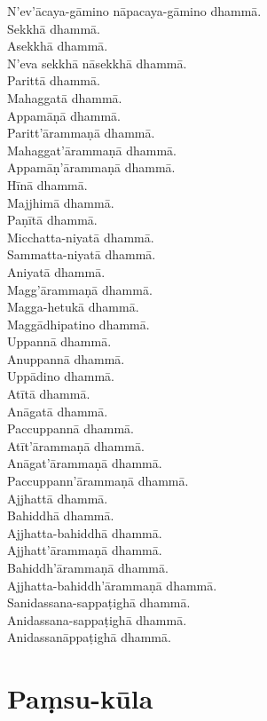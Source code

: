 N'ev'ācaya-gāmino nāpacaya-gāmino dhammā.\\
Sekkhā dhammā.\\
Asekkhā dhammā.\\
N'eva sekkhā nāsekkhā dhammā.\\
Parittā dhammā.\\
Mahaggatā dhammā.\\
Appamāṇā dhammā.\\
Paritt'ārammaṇā dhammā.\\
Mahaggat'ārammaṇā dhammā.\\
Appamāṇ'ārammaṇā dhammā.\\
Hīnā dhammā.\\
Majjhimā dhammā.\\
Paṇītā dhammā.\\
Micchatta-niyatā dhammā.\\
Sammatta-niyatā dhammā.\\
Aniyatā dhammā.\\
Magg'ārammaṇā dhammā.\\
Magga-hetukā dhammā.\\
Maggādhipatino dhammā.\\
Uppannā dhammā.\\
Anuppannā dhammā.\\
Uppādino dhammā.\\
Atītā dhammā.\\
Anāgatā dhammā.\\
Paccuppannā dhammā.\\
Atīt'ārammaṇā dhammā.\\
Anāgat'ārammaṇā dhammā.\\
Paccuppann'ārammaṇā dhammā.\\
Ajjhattā dhammā.\\
Bahiddhā dhammā.\\
Ajjhatta-bahiddhā dhammā.\\
Ajjhatt'ārammaṇā dhammā.\\
Bahiddh'ārammaṇā dhammā.\\
Ajjhatta-bahiddh'ārammaṇā dhammā.\\
Sanidassana-sappaṭighā dhammā.\\
Anidassana-sappaṭighā dhammā.\\
Anidassanāppaṭighā dhammā.


\clearpage

\section{Paṃsu-kūla}

